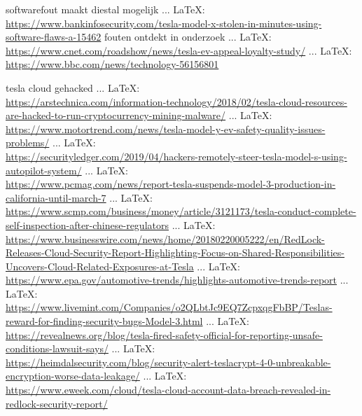 \begin{thebibliography}{99}
softwarefout maakt diestal mogelijk
 ... \LaTeX:\\ \url{https://www.bankinfosecurity.com/tesla-model-x-stolen-in-minutes-using-software-flaws-a-15462}
fouten ontdekt in onderzoek
 ... \LaTeX:\\ \url{https://www.cnet.com/roadshow/news/tesla-ev-appeal-loyalty-study/}
 ... \LaTeX:\\ \url{https://www.bbc.com/news/technology-56156801}








tesla cloud gehacked
 ... \LaTeX:\\ \url{https://arstechnica.com/information-technology/2018/02/tesla-cloud-resources-are-hacked-to-run-cryptocurrency-mining-malware/}
 ... \LaTeX:\\ \url{https://www.motortrend.com/news/tesla-model-y-ev-safety-quality-issues-problems/}
 ... \LaTeX:\\ \url{https://securityledger.com/2019/04/hackers-remotely-steer-tesla-model-s-using-autopilot-system/}
 ... \LaTeX:\\ \url{https://www.pcmag.com/news/report-tesla-suspends-model-3-production-in-california-until-march-7}
 ... \LaTeX:\\ \url{https://www.scmp.com/business/money/article/3121173/tesla-conduct-complete-self-inspection-after-chinese-regulators}
 ... \LaTeX:\\ \url{https://www.businesswire.com/news/home/20180220005222/en/RedLock-Releases-Cloud-Security-Report-Highlighting-Focus-on-Shared-Responsibilities-Uncovers-Cloud-Related-Exposures-at-Tesla}
 ... \LaTeX:\\ \url{https://www.epa.gov/automotive-trends/highlights-automotive-trends-report}
 ... \LaTeX:\\ \url{https://www.livemint.com/Companies/o2QLbtJc9EQ7ZcpxqgFbBP/Teslas-reward-for-finding-security-bugs-Model-3.html}
 ... \LaTeX:\\ \url{https://revealnews.org/blog/tesla-fired-safety-official-for-reporting-unsafe-conditions-lawsuit-says/}
 ... \LaTeX:\\ \url{https://heimdalsecurity.com/blog/security-alert-teslacrypt-4-0-unbreakable-encryption-worse-data-leakage/}
 ... \LaTeX:\\ \url{https://www.eweek.com/cloud/tesla-cloud-account-data-breach-revealed-in-redlock-security-report/}

\end{thebibliography}
